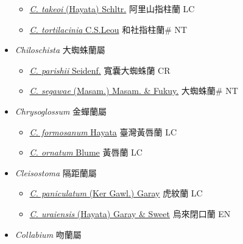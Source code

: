 \begin{itemize}
\begin{itemize}
        \item[] \href{http://www.theplantlist.org/tpl1.1/search?q=Cheirostylis+takeoi}{\textit{C. takeoi} (Hayata) Schltr.}   阿里山指柱蘭 LC
        \item[] \href{http://www.theplantlist.org/tpl1.1/search?q=Cheirostylis+tortilacinia}{\textit{C. tortilacinia} C.S.Leou}   和社指柱蘭\# NT
  \end{itemize}
 \item[] \textit{Chiloschista} 大蜘蛛蘭屬
                    
  \begin{itemize}
        \item[] \href{http://www.theplantlist.org/tpl1.1/search?q=Chiloschista+parishii}{\textit{C. parishii} Seidenf.}   寬囊大蜘蛛蘭 CR
        \item[] \href{http://www.theplantlist.org/tpl1.1/search?q=Chiloschista+segawae}{\textit{C. segawae} (Masam.) Masam. \& Fukuy.}   大蜘蛛蘭\# NT
  \end{itemize}
 \item[] \textit{Chrysoglossum} 金蟬蘭屬
                    
  \begin{itemize}
        \item[] \href{http://www.theplantlist.org/tpl1.1/search?q=Chrysoglossum+formosanum}{\textit{C. formosanum} Hayata}   臺灣黃唇蘭 LC
        \item[] \href{http://www.theplantlist.org/tpl1.1/search?q=Chrysoglossum+ornatum}{\textit{C. ornatum} Blume}   黃唇蘭 LC
  \end{itemize}
 \item[] \textit{Cleisostoma} 隔距蘭屬
                    
  \begin{itemize}
        \item[] \href{http://www.theplantlist.org/tpl1.1/search?q=Cleisostoma+paniculatum}{\textit{C. paniculatum} (Ker Gawl.) Garay}   虎紋蘭 LC
        \item[] \href{http://www.theplantlist.org/tpl1.1/search?q=Cleisostoma+uraiensis}{\textit{C. uraiensis} (Hayata) Garay \& Sweet}   烏來閉口蘭 EN
  \end{itemize}
 \item[] \textit{Collabium} 吻蘭屬
                    

\end{itemize}
